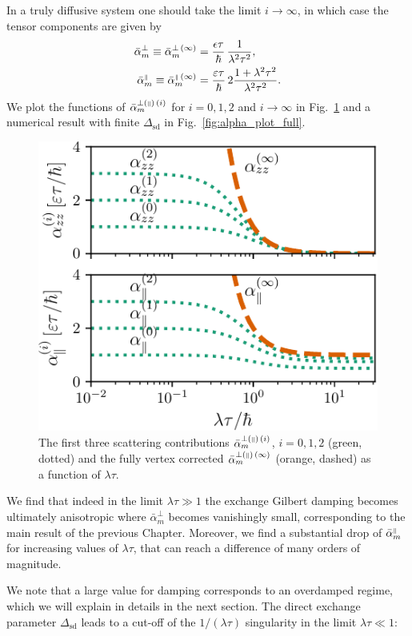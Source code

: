 In a truly diffusive system one should take the limit $i\rightarrow\infty$, in which case the tensor components are given by
\begin{align}
\label{eq:alphaperpzerodelta}
    \bar{\alpha}_{m}^{\perp}\equiv\bar{\alpha}_{m}^{\perp\,(\infty)}  & = \frac{\epsilon \tau}{\hbar}\, \frac{1}{\lambda^2\tau^2},\\
  \label{eq:alphaparallelzerodelta}  \bar{\alpha}_{m}^{{\scriptscriptstyle\parallel}}\equiv\bar{\alpha}_{m}^{{\scriptscriptstyle\parallel}\,(\infty)}  & = \frac{\varepsilon\tau}{\hbar}\,2\frac{1+\lambda^2\tau^2}{\lambda^2\tau^2}.
\end{align}
We plot the functions of $\bar{\alpha}_{m}^{\perp({\scriptscriptstyle\parallel})\,(i)}$ for $i=0,1,2$ and $i\rightarrow\infty$ in Fig.~\ref{fig:alpha_plot} and a numerical result with finite $\Delta_\text{sd}$ in Fig.~\ref{fig:alpha_plot_full}. 
\begin{figure}
    \centering
    \includegraphics[width=0.6\linewidth]{gfx/alpha_plot2}
    \caption{The first three scattering contributions $\bar{\alpha}_{m}^{\perp({\scriptscriptstyle\parallel})\,(i)}$, $i=0,1,2$ (green, dotted) and the fully vertex corrected $\bar{\alpha}_{m}^{\perp({\scriptscriptstyle\parallel})\,(\infty)}$ (orange, dashed) as a function of $\lambda \tau$. }
    \label{fig:alpha_plot}
\end{figure}

We find that indeed in the limit $\lambda\tau\gg1$ the exchange Gilbert damping becomes ultimately anisotropic where $\bar{\alpha}_{m}^{\perp}$ becomes vanishingly small, corresponding to the main result of the previous Chapter. Moreover, we find a substantial drop of $\bar{\alpha}_{m}^{{\scriptscriptstyle\parallel}}$ for increasing values of $\lambda\tau$, that can reach a difference of many orders of magnitude. 

We note that a large value for damping corresponds to an overdamped regime, which we will explain in details in the next section. The direct exchange parameter $\Delta_\text{sd}$ leads to a cut-off of the $1/(\lambda\tau)$ singularity in the limit $\lambda\tau\ll1$:


